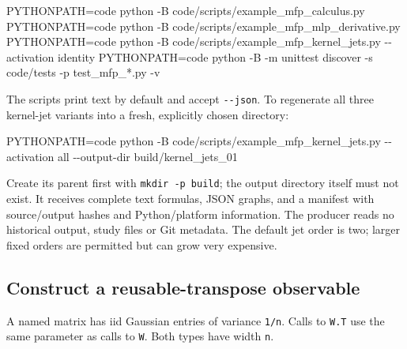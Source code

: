 \documentclass[
  11pt,
]{article}
\newenvironment{Shaded}{\begin{snugshade}}{\end{snugshade}}
\newcommand{\AttributeTok}[1]{\textcolor[rgb]{0.40,0.45,0.13}{#1}}
\newcommand{\ExtensionTok}[1]{\textcolor[rgb]{0.00,0.23,0.31}{#1}}
\newcommand{\NormalTok}[1]{\textcolor[rgb]{0.00,0.23,0.31}{#1}}
\newcommand{\OperatorTok}[1]{\textcolor[rgb]{0.37,0.37,0.37}{#1}}
\newcommand{\StringTok}[1]{\textcolor[rgb]{0.13,0.47,0.30}{#1}}
\newcommand{\VariableTok}[1]{\textcolor[rgb]{0.07,0.07,0.07}{#1}}
\theoremstyle{definition}
\theoremstyle{plain}
\theoremstyle{plain}
\theoremstyle{plain}
\theoremstyle{remark}
\begin{document}
\begin{Shaded}
\begin{Highlighting}[]
\VariableTok{PYTHONPATH}\OperatorTok{=}\NormalTok{code }\ExtensionTok{python} \AttributeTok{{-}B}\NormalTok{ code/scripts/example\_mfp\_calculus.py}
\VariableTok{PYTHONPATH}\OperatorTok{=}\NormalTok{code }\ExtensionTok{python} \AttributeTok{{-}B}\NormalTok{ code/scripts/example\_mfp\_mlp\_derivative.py}
\VariableTok{PYTHONPATH}\OperatorTok{=}\NormalTok{code }\ExtensionTok{python} \AttributeTok{{-}B}\NormalTok{ code/scripts/example\_mfp\_kernel\_jets.py }\AttributeTok{{-}{-}activation}\NormalTok{ identity}
\VariableTok{PYTHONPATH}\OperatorTok{=}\NormalTok{code }\ExtensionTok{python} \AttributeTok{{-}B} \AttributeTok{{-}m}\NormalTok{ unittest discover }\AttributeTok{{-}s}\NormalTok{ code/tests }\AttributeTok{{-}p} \StringTok{\textquotesingle{}test\_mfp\_*.py\textquotesingle{}} \AttributeTok{{-}v}
\end{Highlighting}
\end{Shaded}

The scripts print text by default and accept \texttt{-\/-json}. To
regenerate all three kernel-jet variants into a fresh, explicitly chosen
directory:

\begin{Shaded}
\begin{Highlighting}[]
\VariableTok{PYTHONPATH}\OperatorTok{=}\NormalTok{code }\ExtensionTok{python} \AttributeTok{{-}B}\NormalTok{ code/scripts/example\_mfp\_kernel\_jets.py }\AttributeTok{{-}{-}activation}\NormalTok{ all }\AttributeTok{{-}{-}output{-}dir}\NormalTok{ build/kernel\_jets\_01}
\end{Highlighting}
\end{Shaded}

Create its parent first with \texttt{mkdir\ -p\ build}; the output
directory itself must not exist. It receives complete text formulas,
JSON graphs, and a manifest with source/output hashes and
Python/platform information. The producer reads no historical output,
study files or Git metadata. The default jet order is two; larger fixed
orders are permitted but can grow very expensive.

\subsection{Construct a reusable-transpose
observable}\label{construct-a-reusable-transpose-observable}

A named matrix has iid Gaussian entries of variance \texttt{1/n}. Calls
to \texttt{W.T} use the same parameter as calls to \texttt{W}. Both
types have width \texttt{n}.
\end{document}
